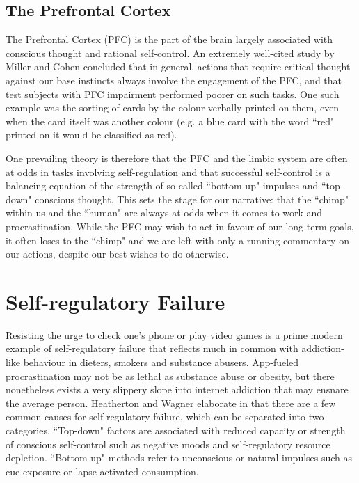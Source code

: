 \subsection{The Prefrontal Cortex}
The Prefrontal Cortex (PFC) is the part of the brain largely associated with conscious thought and rational self-control. An extremely well-cited study by Miller and Cohen \cite{miller2001integrative} concluded that in general, actions that require critical thought against our base instincts always involve the engagement of the PFC, and that test subjects with PFC impairment performed poorer on such tasks. One such example was the sorting of cards by the colour verbally printed on them, even when the card itself was another colour (e.g. a blue card with the word ``red" printed on it would be classified as red).

One prevailing theory is therefore that the PFC and the limbic system are often at odds in tasks involving self-regulation \cite{heatherton2011cognitive} and that successful self-control is a balancing equation of the strength of so-called ``bottom-up" impulses and ``top-down" conscious thought. This sets the stage for our narrative: that the ``chimp" within us and the ``human" are always at odds when it comes to work and procrastination. While the PFC may wish to act in favour of our long-term goals, it often loses to the ``chimp" and we are left with only a running commentary on our actions, despite our best wishes to do otherwise.

\section{Self-regulatory Failure}
Resisting the urge to check one's phone or play video games is a prime modern example of self-regulatory failure that reflects much in common with addiction-like behaviour in dieters, smokers and substance abusers. App-fueled procrastination may not be as lethal as substance abuse or obesity, but there nonetheless exists a very slippery slope into internet addiction that may ensnare the average person. Heatherton and Wagner elaborate in \cite{heatherton2011cognitive} that there are a few common causes for self-regulatory failure, which can be separated into two categories. ``Top-down" factors are associated with reduced capacity or strength of conscious self-control such as negative moods and self-regulatory resource depletion. ``Bottom-up" methods refer to unconscious or natural impulses such as cue exposure or lapse-activated consumption.

